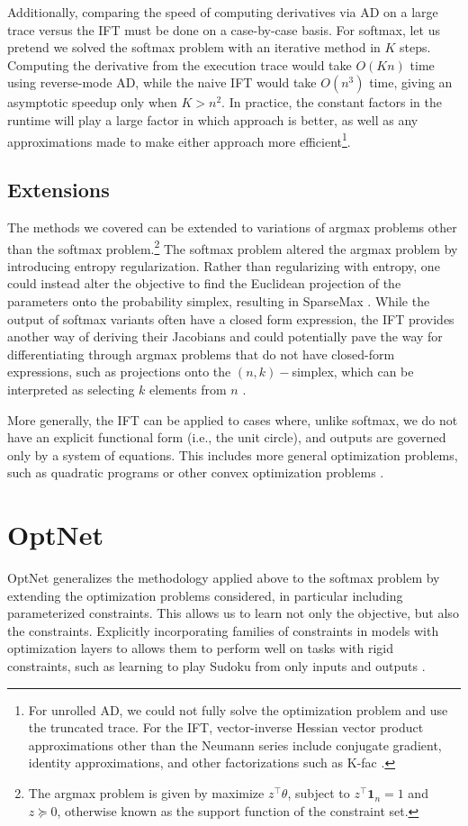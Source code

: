 \documentclass[11pt]{article}
\begin{document}
Additionally, comparing the speed of computing derivatives via AD on a large trace versus the IFT
must be done on a case-by-case basis.
For softmax, let us pretend we solved the softmax problem with an iterative method in $K$ steps.
Computing the derivative from the execution trace would take $O(Kn)$ time using reverse-mode AD,
while the naive IFT would take $O(n^3)$ time, giving an asymptotic speedup only when $K > n^2$.
In practice, the constant factors in the runtime will play a large factor in which approach
is better, as well as any approximations made to make either approach more efficient\footnote{
For unrolled AD, we could not fully solve the optimization problem and use the truncated trace.
For the IFT, vector-inverse Hessian vector product approximations other than the Neumann series
include conjugate gradient, identity approximations, and other factorizations such as K-fac
\citep{kfac}.
}.

\subsection{Extensions}
The methods we covered can be extended to variations of argmax problems
other than the softmax problem.\footnote{
The argmax problem is given by maximize $z^\top \theta$, subject to $z^\top\mathbf{1}_n=1$
and $z\succeq 0$, otherwise known as the support function of the constraint set.
}
The softmax problem altered the argmax problem by introducing entropy regularization.
Rather than regularizing with entropy, one could instead alter the objective to find
the Euclidean projection of the parameters onto the probability simplex,
resulting in SparseMax \citep{sparsemax}.
While the output of softmax variants often have a closed form expression,
the IFT provides another way of deriving their Jacobians
and could potentially pave the way for differentiating through argmax problems
that do not have closed-form expressions,
such as projections onto the $(n,k)-$simplex,
which can be interpreted as selecting $k$ elements from $n$ \citep{rankmax}.

More generally, the IFT can be applied to cases where, unlike softmax,
we do not have an explicit functional form (i.e., the unit circle),
and outputs are governed only by a system of equations.
This includes more general optimization problems, such as quadratic programs \citep{optnet}
or other convex optimization problems \citep{agrawal2019diffcvx}.

\section{OptNet}
\label{sec:optnet}
OptNet generalizes the methodology applied above to the softmax problem by
extending the optimization problems considered,
in particular including parameterized constraints.
This allows us to learn not only the objective, but also the constraints.
Explicitly incorporating families of constraints in models
with optimization layers to allows them to perform well
on tasks with rigid constraints, such as learning to play
Sudoku from only inputs and outputs \citep{optnet}.
\end{document}
